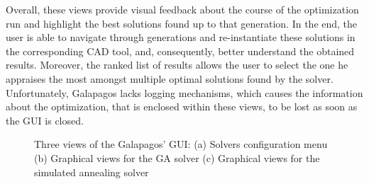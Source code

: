 	Overall, these views provide visual feedback about the course of the optimization run and highlight the best solutions found up to that generation. In the end, the user is able to navigate through generations and re-instantiate these solutions in the corresponding \ac{CAD} tool, and, consequently, better understand the obtained results. Moreover, the ranked list of results allows the user to select the one he appraises the most amongst multiple optimal solutions found by the solver. Unfortunately, Galapagos lacks logging mechanisms, which causes the information about the optimization, that is enclosed within these views, to be lost as soon as the \ac{GUI} is closed. 
	\begin{figure}[htbp]
		\centering
		\hfill
		\hfill
		
		\caption[Galapagos GUI]{ Three views of the Galapagos' \ac{GUI}: (a) Solvers configuration menu (b) Graphical views for the \ac{GA} solver (c) Graphical views for the simulated annealing solver}
		\label{fig:galapagos}
	\end{figure}
	
